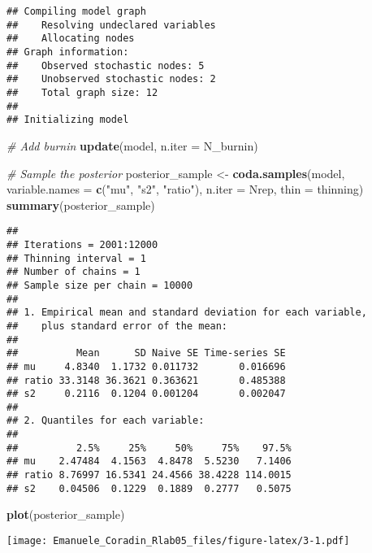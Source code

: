 \documentclass[
]{article}
\newenvironment{Shaded}{\begin{snugshade}}{\end{snugshade}}
\newcommand{\AttributeTok}[1]{\textcolor[rgb]{0.13,0.29,0.53}{#1}}
\newcommand{\CommentTok}[1]{\textcolor[rgb]{0.56,0.35,0.01}{\textit{#1}}}
\newcommand{\FunctionTok}[1]{\textcolor[rgb]{0.13,0.29,0.53}{\textbf{#1}}}
\newcommand{\NormalTok}[1]{#1}
\newcommand{\OtherTok}[1]{\textcolor[rgb]{0.56,0.35,0.01}{#1}}
\newcommand{\StringTok}[1]{\textcolor[rgb]{0.31,0.60,0.02}{#1}}
\begin{document}
\begin{verbatim}
## Compiling model graph
##    Resolving undeclared variables
##    Allocating nodes
## Graph information:
##    Observed stochastic nodes: 5
##    Unobserved stochastic nodes: 2
##    Total graph size: 12
## 
## Initializing model
\end{verbatim}

\begin{Shaded}
\begin{Highlighting}[]
\CommentTok{\# Add burnin}
\FunctionTok{update}\NormalTok{(model, }\AttributeTok{n.iter =}\NormalTok{ N\_burnin)}

\CommentTok{\# Sample the posterior}
\NormalTok{posterior\_sample }\OtherTok{\textless{}{-}} \FunctionTok{coda.samples}\NormalTok{(model,}
                       \AttributeTok{variable.names =} \FunctionTok{c}\NormalTok{(}\StringTok{"mu"}\NormalTok{, }\StringTok{"s2"}\NormalTok{, }\StringTok{"ratio"}\NormalTok{),}
                       \AttributeTok{n.iter =}\NormalTok{ Nrep, }\AttributeTok{thin =}\NormalTok{ thinning)}
\FunctionTok{summary}\NormalTok{(posterior\_sample)}
\end{Highlighting}
\end{Shaded}

\begin{verbatim}
## 
## Iterations = 2001:12000
## Thinning interval = 1 
## Number of chains = 1 
## Sample size per chain = 10000 
## 
## 1. Empirical mean and standard deviation for each variable,
##    plus standard error of the mean:
## 
##          Mean      SD Naive SE Time-series SE
## mu     4.8340  1.1732 0.011732       0.016696
## ratio 33.3148 36.3621 0.363621       0.485388
## s2     0.2116  0.1204 0.001204       0.002047
## 
## 2. Quantiles for each variable:
## 
##          2.5%     25%     50%     75%    97.5%
## mu    2.47484  4.1563  4.8478  5.5230   7.1406
## ratio 8.76997 16.5341 24.4566 38.4228 114.0015
## s2    0.04506  0.1229  0.1889  0.2777   0.5075
\end{verbatim}

\begin{Shaded}
\begin{Highlighting}[]
\FunctionTok{plot}\NormalTok{(posterior\_sample)}
\end{Highlighting}
\end{Shaded}

\texttt{[image: Emanuele\_Coradin\_Rlab05\_files/figure-latex/3-1.pdf]}
\end{document}
